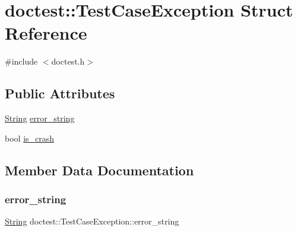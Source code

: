 \hypertarget{structdoctest_1_1_test_case_exception}{}\section{doctest\+:\+:Test\+Case\+Exception Struct Reference}
\label{structdoctest_1_1_test_case_exception}


{\ttfamily \#include $<$doctest.\+h$>$}

\subsection*{Public Attributes}
\begin{DoxyCompactItemize}
\item 
\mbox{\hyperlink{classdoctest_1_1_string}{String}} \mbox{\hyperlink{structdoctest_1_1_test_case_exception_a656c8971ccbedc7d3a0a38f7c6af927e}{error\+\_\+string}}
\item 
bool \mbox{\hyperlink{structdoctest_1_1_test_case_exception_af30d801dae6dd2f4ea01690bbf5faeca}{is\+\_\+crash}}
\end{DoxyCompactItemize}


\subsection{Member Data Documentation}
\mbox{\label{structdoctest_1_1_test_case_exception_a656c8971ccbedc7d3a0a38f7c6af927e}} 
\subsubsection{\texorpdfstring{error\+\_\+string}{error\_string}}
{\footnotesize\ttfamily \mbox{\hyperlink{classdoctest_1_1_string}{String}} doctest\+::\+Test\+Case\+Exception\+::error\+\_\+string}

\mbox{\label{structdoctest_1_1_test_case_exception_af30d801dae6dd2f4ea01690bbf5faeca}} 

